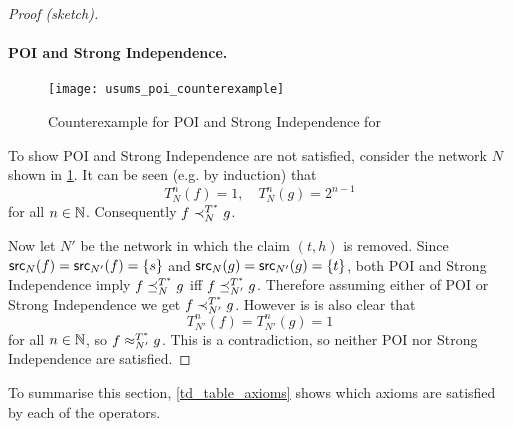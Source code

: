 \begin{proof}[Proof (sketch)]
\paragraph{POI and Strong Independence.}

\begin{figure}[ht]
\centering
\texttt{[image: usums\_poi\_counterexample]}
\caption{
    Counterexample for POI and Strong Independence for \usums{}
}
\label{td_fig_usums_poi_counterexample}
\end{figure}

To show POI and Strong Independence are not satisfied, consider the network $N$
shown in \cref{td_fig_usums_poi_counterexample}. It can be seen (e.g. by
induction) that
\[
    T_N^n(f) = 1,
    \quad
    T_N^n(g) = 2^{n-1}
\]
for all $n \in \mathbb{N}$. Consequently $f \prec_N^{T^*} g$.\footnotemark


Now let $N'$ be the network in which the claim $(t, h)$ is removed. Since
$\mathsf{src}_N(f) = \mathsf{src}_{N'}(f) = \{s\}$ and $\mathsf{src}_N(g) = \mathsf{src}_{N'}(g) = \{t\}$, both
POI and Strong Independence imply $f \preceq_N^{T^*} g$ iff $f \preceq_{N'}^{T^*} g$.
Therefore assuming either of POI or Strong Independence we get $f
\prec_{N'}^{T^*} g$. However is is also clear that
\[
    T_{N'}^n(f) = T_{N'}^n(g) = 1
\]
for all $n \in \mathbb{N}$, so $f \approx_{N'}^{T^*} g$. This is a contradiction, so
neither POI nor Strong Independence are satisfied.
\end{proof}

To summarise this section, \cref{td_table_axioms} shows which axioms are
satisfied by each of the operators.

